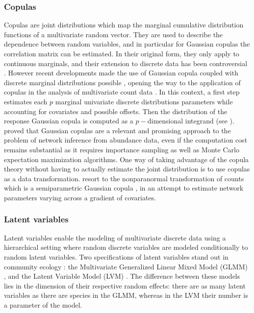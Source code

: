 \subsubsection{Copulas}
Copulas are  joint  distributions which map the marginal  cumulative distribution functions of a multivariate random vector.  They are used to describe the dependence between random variables, and in particular for Gaussian copulas the correlation matrix can be estimated. In their original form, they only apply to continuous marginals, and their extension to discrete data has been controversial \citep{F17}. However recent developments made the use of  Gaussian copula coupled with discrete marginal distributions possible \citep{PCJ12,PHW18}, opening the way to the application of copulas in the analysis of multivariate count data \citep{AVP19}. In this context, a first step estimates each $p$ marginal univariate discrete distributions parameters while accounting for covariates and possible offsets. Then the distribution of the response Gaussian copula is computed as a $p-$dimensional integrand (see \citet{PHW18}). \citet{PWT19} proved that  Gaussian copulas are a relevant and promising approach to the problem of network inference from abundance data, even if the computation cost remains substantial as it requires importance sampling as well as Monte Carlo expectation maximization algorithms. One way of taking advantage of the copula theory without having to actually estimate the joint distribution is to use copulas as a data transformation.\cite{MRFcov} resort to the nonparanormal transformation of counts which is a semiparametric Gaussian copula \citep{LLW09}, in an attempt to estimate network parameters varying across a gradient of covariates. 

\subsubsection{Latent variables}

Latent variables enable the modeling of multivariate discrete data using a hierarchical setting where random discrete variables are modeled conditionally to random latent variables.  Two specifications of  latent variables stand out in community ecology \citep{WBO15}:  the Multivariate Generalized Linear Mixed Model (GLMM) \citep{OHS10, PTM14}, and the Latent Variable Model (LVM)  \citep{OAP16, OTN17}. The difference between these models lies in the dimension of their respective random effects: there are as many latent variables as there are species in the GLMM, whereas in the LVM their number is a parameter of the model. 

